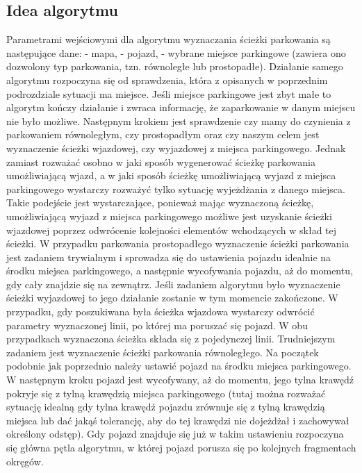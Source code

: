 \documentclass[a4paper,11pt,twoside]{report}
\theoremstyle{definition}
\begin{document}
\subsection{Idea algorytmu}

Parametrami wejściowymi dla algorytmu wyznaczania ścieżki parkowania są następujące dane:
- mapa,
- pojazd,
- wybrane miejsce parkingowe (zawiera ono dozwolony typ parkowania, tzn. równoległe lub prostopadłe).
Działanie samego algorytmu rozpoczyna się od sprawdzenia, która z opisanych w poprzednim podrozdziale sytuacji ma miejsce. Jeśli miejsce parkingowe jest zbyt małe to algorytm kończy działanie i zwraca informację, że zaparkowanie w danym miejscu nie było możliwe. Następnym krokiem jest sprawdzenie czy mamy do czynienia z parkowaniem równoległym, czy prostopadłym oraz czy naszym celem jest wyznaczenie ścieżki wjazdowej, czy wyjazdowej z miejsca parkingowego.
Jednak zamiast rozważać osobno w jaki sposób wygenerować ścieżkę parkowania umożliwiającą wjazd, a w jaki sposób ścieżkę umożliwiającą wyjazd z miejsca parkingowego wystarczy rozważyć tylko sytuację wyjeżdżania z danego miejsca. Takie podejście jest wystarczające, ponieważ mając wyznaczoną ścieżkę, umożliwiającą wyjazd z miejsca parkingowego możliwe jest uzyskanie ścieżki wjazdowej poprzez odwrócenie kolejności elementów wchodzących w skład tej ścieżki.
W przypadku parkowania prostopadłego wyznaczenie ścieżki parkowania jest zadaniem trywialnym i sprowadza się do ustawienia pojazdu idealnie na środku miejsca parkingowego, a następnie wycofywania pojazdu, aż do momentu, gdy cały znajdzie się na zewnątrz. Jeśli zadaniem algorytmu było wyznaczenie ścieżki wyjazdowej to jego działanie zostanie w tym momencie zakończone. W przypadku, gdy poszukiwana była ścieżka wjazdowa wystarczy odwrócić parametry wyznaczonej linii, po której ma poruszać się pojazd.  W obu przypadkach wyznaczona ścieżka składa się z pojedynczej linii.
Trudniejszym zadaniem jest wyznaczenie ścieżki parkowania równoległego. Na początek podobnie jak poprzednio należy ustawić pojazd na środku miejsca parkingowego. W następnym kroku pojazd jest wycofywany, aż do momentu, jego tylna krawędź pokryje się z tylną krawędzią miejsca parkingowego (tutaj można rozważać sytuację idealną gdy tylna krawędź pojazdu zrównuje się z tylną krawędzią miejsca lub dać jakąś tolerancję, aby do tej krawędzi nie dojeżdżał i zachowywał określony odstęp). Gdy pojazd znajduje się już w takim ustawieniu rozpoczyna się główna pętla algorytmu, w której pojazd porusza się po kolejnych fragmentach okręgów. 
\end{document}
